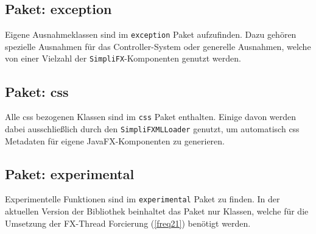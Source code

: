 \subsection{Paket: exception}
Eigene Ausnahmeklassen sind im \texttt{exception} Paket aufzufinden. Dazu gehören spezielle Ausnahmen für das Controller-System oder generelle Ausnahmen, welche von einer Vielzahl der \texttt{SimpliFX}-Komponenten genutzt werden.
\subsection{Paket: css}
Alle \ac{css} bezogenen Klassen sind im \texttt{css} Paket enthalten. Einige davon werden dabei ausschließlich durch den \texttt{SimpliFXMLLoader} genutzt, um automatisch \ac{css} Metadaten für eigene JavaFX-Komponenten zu generieren. 
\subsection{Paket: experimental}
Experimentelle Funktionen sind im \texttt{experimental} Paket zu finden. In der aktuellen Version der Bibliothek beinhaltet das Paket nur Klassen, welche für die Umsetzung der FX-Thread Forcierung (\autoref{freq21}) benötigt werden.

